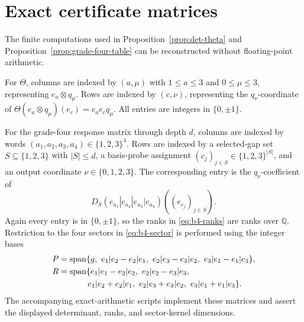 \appendix
\section{Exact certificate matrices}\label{app:certificates}

The finite computations used in Proposition~\ref{prop:det-theta} and
Proposition~\ref{prop:grade-four-table} can be reconstructed without floating-point arithmetic.

For $\Theta$, columns are indexed by $(a,\mu)$ with
$1\le a\le3$ and $0\le\mu\le3$, representing $e_a\otimes q_\mu$.
Rows are indexed by $(c,\nu)$, representing the $q_\nu$-coordinate of
$\Theta(e_a\otimes q_\mu)(e_c)=e_ae_cq_\mu$.  All entries are integers in
$\{0,\pm1\}$.

For the grade-four response matrix through depth $d$, columns are indexed by
words $(a_1,a_2,a_3,a_4)\in\{1,2,3\}^4$.  Rows are indexed by a selected-gap set
$S\subseteq\{1,2,3\}$ with $|S|\le d$, a basis-probe assignment
$(c_j)_{j\in S}\in\{1,2,3\}^{|S|}$, and an output coordinate
$\nu\in\{0,1,2,3\}$.  The corresponding entry is the $q_\nu$-coefficient of
\[
  D_S(e_{a_1}|e_{a_2}|e_{a_3}|e_{a_4})((e_{c_j})_{j\in S}).
\]
Again every entry is in $\{0,\pm1\}$, so the ranks in
\eqref{eq:b4-ranks} are ranks over $\mathbb Q$.  Restriction to the four sectors in
\eqref{eq:b4-sector} is performed using the integer bases
\[
\begin{aligned}
P&=\Span\{g,\ e_1|e_2-e_2|e_1,\ e_2|e_3-e_3|e_2,\ e_3|e_1-e_1|e_3\},\\
R&=\Span\{e_1|e_1-e_2|e_2,\ e_2|e_2-e_3|e_3,\\
&\hspace{3.5em}e_1|e_2+e_2|e_1,\ e_2|e_3+e_3|e_2,\ e_3|e_1+e_1|e_3\}.
\end{aligned}
\]
The accompanying exact-arithmetic scripts implement these matrices and assert the displayed determinant, ranks, and sector-kernel dimensions.

